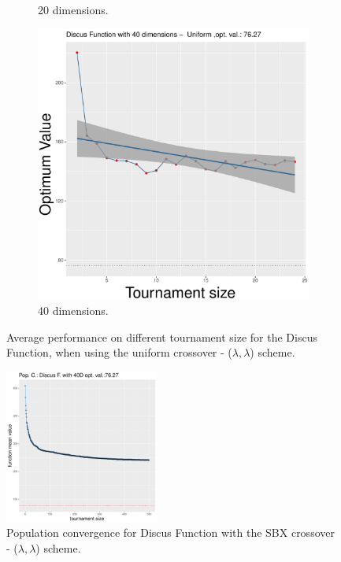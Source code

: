 \begin{figure}[t]
\begin{subfigure}[b]{0.33\textwidth}
		\caption{20 dimensions.}
	\end{subfigure}
	\begin{subfigure}[b]{0.33\textwidth}
		\centering
		\includegraphics[width=\textwidth]{img/uniform-40D/unimodal_uniform_11_dim_40.pdf}
		\caption{40 dimensions.}
	\end{subfigure}
	\caption{Average performance on different tournament size for the Discus Function, when using the uniform crossover - ($\lambda, \lambda$) scheme.}
	\label{uniform-11-a}
\end{figure}


\begin{figure}[t]
	\includegraphics[width=0.45\textwidth]{img/SBX-40D/covergency_unimodal_sbx_11_dim_40.pdf}
	\caption{Population convergence for Discus Function with the SBX crossover - ($\lambda, \lambda$) scheme.}
	\label{convergence-sbx-11-a}
\end{figure}


